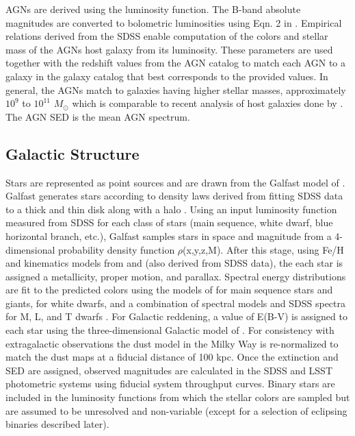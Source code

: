 \documentclass[]{article}
\begin{document}
{AGNs are derived using the \citet{bongiorno12} luminosity function. The
B-band absolute magnitudes are converted to bolometric luminosities
using Eqn. 2 in \citet{hopkins07}. Empirical relations derived from the
SDSS enable computation of the colors and stellar mass of the AGNs
host galaxy from its luminosity. These parameters are used together
with the redshift values from the AGN catalog to match each AGN to a
galaxy in the galaxy catalog that best corresponds to the provided
values. In general, the AGNs match to galaxies having higher stellar
masses, approximately $10^{9}$ to $10^{11}$ $M_{\odot}$ which is
comparable to recent analysis of host galaxies done by \citet{xue11}. The
AGN SED is the \citet{vandenberk} mean AGN spectrum. 

\subsection{Galactic Structure \label{sec:stars}}

Stars are represented as point sources and are drawn from the Galfast model of \citep{galfast}.  
Galfast generates stars according to
density laws  derived from fitting SDSS data
to a thick and thin disk along with a halo \citep{juric}. Using an 
input luminosity function measured from SDSS for each class of stars 
(main sequence, white dwarf, blue horizontal branch, etc.), Galfast samples stars in space and magnitude 
from a 4-dimensional probability density function
$\rho$(x,y,z,M). After this stage, using Fe/H and kinematics models
from \citet{ivezic08} and \citet{bond09} (also derived from SDSS data), 
the each star is assigned a metallicity, proper motion, and parallax.
Spectral energy distributions are fit to the predicted
colors using the models of \citet{kurucz93} for main sequence
stars and giants, \citet{bergeron95} for white dwarfs,
and a combination of spectral models and SDSS spectra for M, L, and T
dwarfs 
\citep[e.g.][]{cushing05,bochanski07,burrows06,pettersen89,kowalski10}. 
For Galactic reddening, a value of E(B-V) is assigned to each
star using the three-dimensional Galactic model of 
\citet{amores05}. For consistency with extragalactic observations the
dust model in the Milky Way is re-normalized to match the 
\citet{schlegel98} dust maps at a fiducial distance of 100 kpc.  Once the 
extinction and SED are assigned, observed magnitudes are calculated in
the SDSS and LSST photometric systems using fiducial system throughput curves.
Binary stars are included in the luminosity functions from which the
stellar colors are sampled but are assumed to be unresolved and
non-variable (except for a selection of eclipsing binaries described
later).

}
\end{document}
